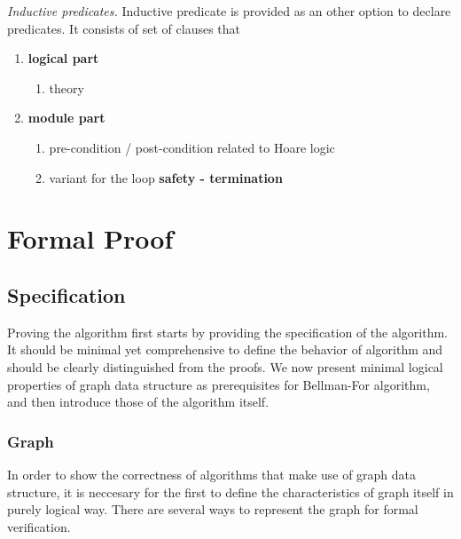 \documentclass[a4paper,12pt]{article}
\begin{document}
\emph{Inductive predicates.} Inductive predicate is provided as an other option to declare predicates. It consists of set of clauses that


\begin{enumerate}
\item \textbf{logical part}

\begin{enumerate}


\item theory

\end{enumerate}

\item \textbf{module part}

\begin{enumerate}

\item pre-condition / post-condition related to Hoare logic
\item variant for the loop \textbf{safety - termination}

\end{enumerate}

\end{enumerate}





\section{Formal Proof}

\subsection{Specification}

Proving the algorithm first starts by providing the specification of the algorithm. It should be minimal yet comprehensive to define the behavior of algorithm and should be clearly distinguished from the proofs. We now present minimal logical properties of graph data structure as prerequisites for Bellman-For algorithm, and then introduce those of the algorithm itself.

\subsubsection{Graph}

In order to show the correctness of algorithms that make use of graph data structure, it is neccesary for the first to define the characteristics of graph itself in purely logical way. There are several ways to represent the graph for formal verification.
\end{document}

